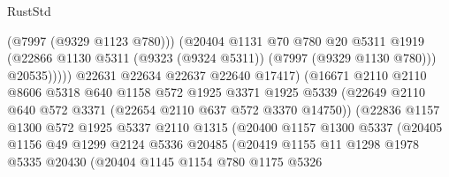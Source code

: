 \begin{lexlean}{RustStd}
\begin{coremodule}
{\begin{coremodule}
{{{{{{{{{{{{{{{{{{{{{{{{{{{{{{{{{{{{{{{{{{{                                      (@7997 (@9329 @1123 @780)))
                                    (@20404
                                      @1131
                                      @70
                                      @780
                                      @20
                                      @5311
                                      @1919
                                      (@22866
                                        @1130
                                        @5311
                                        (@9323 (@9324 @5311))
                                        (@7997 (@9329 @1130 @780)))
                                      @20535)))))
                            @22631
                            @22634
                            @22637
                            @22640
                            @17417)
                          (@16671
                            @2110
                            @2110
                            @8606
                            @5318
                            @640
                            @1158
                            @572
                            @1925
                            @3371
                            @1925
                            @5339
                            (@22649 @2110 @640 @572 @3371 (@22654 @2110 @637 @572 @3370 @14750))
                            (@22836
                              @1157
                              @1300
                              @572
                              @1925
                              @5337
                              @2110
                              @1315
                              (@20400
                                @1157
                                @1300
                                @5337
                                (@20405
                                  @1156
                                  @49
                                  @1299
                                  @2124
                                  @5336
                                  @20485
                                  (@20419
                                    @1155
                                    @11
                                    @1298
                                    @1978
                                    @5335
                                    @20430
                                    (@20404
                                      @1145
                                      @1154
                                      @780
                                      @1175
                                      @5326
}}}}}}}}}}}}}}}}}}}}}}}}}}}}}}}}}}}}}}}}}}}
\end{coremodule}}
\end{coremodule}
\end{lexlean}
